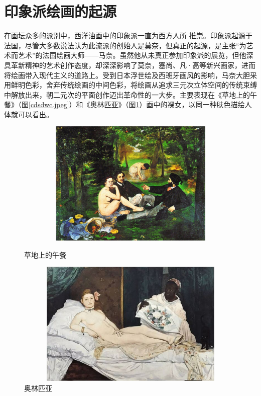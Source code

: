 \documentclass{xcumcmart}
\begin{document}
\section{印象派绘画的起源}
\par 在画坛众多的派别中，西洋油画中的印象派一直为西方人所 推崇。印象派起源于法国，尽管大多数说法认为此流派的创始人是莫奈，但真正的起源，是主张“为艺术而艺术”的法国绘画大师——马奈。虽然他从未真正参加印象派的展览，但他深具革新精神的艺术创作态度，却深深影响了莫奈，塞尚、凡·高等新兴画家，进而将绘画带入现代主义的道路上。受到日本浮世绘及西班牙画风的影响，马奈大胆采用鲜明色彩，舍弃传统绘画的中间色彩，将绘画从追求三元次立体空间的传统束缚中解放出来，朝二元次的平面创作迈出革命性的一大步。主要表现在《草地上的午餐》（图\ref{cdsdwc.jpeg}）和《奥林匹亚》（图\ref{fig:alpy.jpeg}）画中的裸女，以同一种肤色描绘人体就可以看出。
\begin{figure}[htbp]
    \centering
    \begin{minipage}[htbp]{0.48\linewidth}
        \centering
        \includegraphics[width=1\textwidth,height=6cm]{fig/cdsdwc.jpeg}
        \caption{草地上的午餐\label{fig:cdsdwc.jpeg}}
    \end{minipage}
    \hfill
    \begin{minipage}[htbp]{0.48\linewidth}
        \centering
        \includegraphics[width=1\textwidth,height=6cm]{fig/alpy.jpg}
        \caption{奥林匹亚\label{fig:alpy.jpeg}}
    \end{minipage}
    \end{figure}
\end{document}
